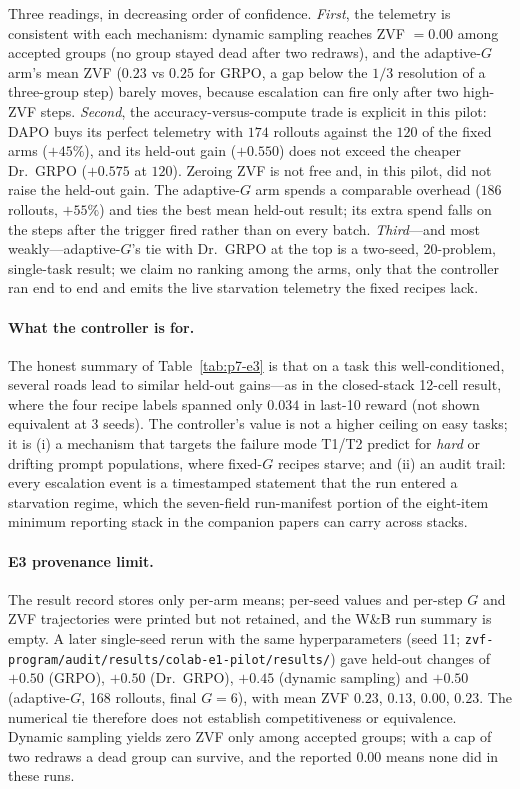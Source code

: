 Three readings, in decreasing order of confidence. \emph{First}, the
telemetry is consistent with each mechanism: dynamic sampling reaches
ZVF $= 0.00$ among accepted groups (no group stayed dead after two redraws),
and the adaptive-$G$ arm's mean ZVF ($0.23$ vs $0.25$ for GRPO, a gap below the
$1/3$ resolution of a three-group step) barely moves, because escalation
can fire only after two high-ZVF steps. \emph{Second}, the accuracy-versus-compute trade
is explicit in this pilot: DAPO buys its perfect telemetry with $174$ rollouts against the
$120$ of the fixed arms ($+45\%$), and its held-out gain ($+0.550$) does not
exceed the cheaper Dr.~GRPO ($+0.575$ at $120$). Zeroing ZVF is not free
and, in this pilot, did not raise the held-out gain. The adaptive-$G$ arm spends a comparable
overhead ($186$ rollouts, $+55\%$) and ties the best mean held-out result;
its extra spend falls on the steps after the trigger fired rather than on
every batch. \emph{Third}---and most weakly---adaptive-$G$'s tie with
Dr.~GRPO at the top is a two-seed, 20-problem, single-task result; we claim
no ranking among the arms, only that the controller ran end to end and
emits the live starvation telemetry the fixed recipes lack.

\paragraph{What the controller is for.} The honest summary of
Table~\ref{tab:p7-e3} is that on a task this well-conditioned, several roads
lead to similar held-out gains---as in the closed-stack 12-cell result, where
the four recipe labels spanned only $0.034$ in last-10 reward (not shown
equivalent at 3 seeds). The controller's
value is not a higher ceiling on easy tasks; it is (i) a mechanism that
targets the failure mode T1/T2 predict for \emph{hard} or drifting prompt
populations, where fixed-$G$ recipes starve; and (ii) an audit trail: every
escalation event is a timestamped statement that the run entered a
starvation regime, which the seven-field run-manifest portion of the
eight-item minimum reporting stack in the
companion papers can carry across stacks.

\paragraph{E3 provenance limit.}
The result record stores only per-arm means; per-seed values and per-step
$G$ and ZVF trajectories were printed but not retained, and the W\&B run
summary is empty. A later single-seed rerun with the same hyperparameters
(seed 11; \texttt{zvf-program/audit/results/colab-e1-pilot/results/}) gave
held-out changes of $+0.50$ (GRPO), $+0.50$ (Dr.~GRPO), $+0.45$ (dynamic
sampling) and $+0.50$ (adaptive-$G$, 168 rollouts, final $G{=}6$), with mean
ZVF $0.23$, $0.13$, $0.00$, $0.23$. The numerical tie therefore does not
establish competitiveness or equivalence. Dynamic sampling yields zero ZVF
only among accepted groups; with a cap of two redraws a dead group can
survive, and the reported $0.00$ means none did in these runs.

